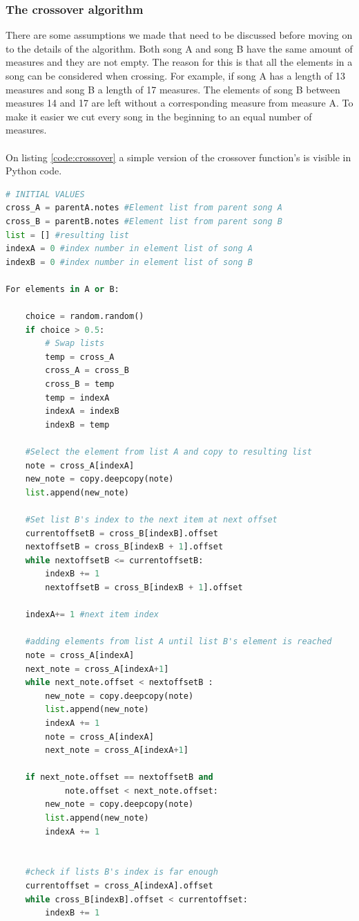 \documentclass[a4paper]{article}
\begin{document}
\subsubsection{The crossover algorithm}
There are some assumptions we made that need to be discussed before moving on to the details of the algorithm. Both song A and song B have the same amount of measures and they are not empty. The reason for this is that all the elements in a song can be considered when crossing. For example, if song A has a length of 13 measures and song B a length of 17 measures. The elements of song B between measures 14 and 17 are left without a corresponding measure from measure A. To make it easier we cut every song in the beginning to an equal number of measures.  
\\\\
On listing \ref{code:crossover} a simple version of the crossover function's is visible in Python code.
\begin{lstlisting}[language=Python,caption={Simplified version of the crossover function},captionpos=b,label=code:crossover]
# INITIAL VALUES
cross_A = parentA.notes #Element list from parent song A
cross_B = parentB.notes #Element list from parent song B
list = [] #resulting list
indexA = 0 #index number in element list of song A
indexB = 0 #index number in element list of song B

For elements in A or B:

	choice = random.random()
	if choice > 0.5:
		# Swap lists 
		temp = cross_A
		cross_A = cross_B
		cross_B = temp
		temp = indexA
		indexA = indexB
		indexB = temp
	
	#Select the element from list A and copy to resulting list
	note = cross_A[indexA]
	new_note = copy.deepcopy(note)
	list.append(new_note)
	
	#Set list B's index to the next item at next offset
	currentoffsetB = cross_B[indexB].offset
	nextoffsetB = cross_B[indexB + 1].offset
	while nextoffsetB <= currentoffsetB:
		indexB += 1
		nextoffsetB = cross_B[indexB + 1].offset
	
	indexA+= 1 #next item index
	
	#adding elements from list A until list B's element is reached
	note = cross_A[indexA]
	next_note = cross_A[indexA+1]
	while next_note.offset < nextoffsetB :
		new_note = copy.deepcopy(note)
		list.append(new_note)
		indexA += 1
		note = cross_A[indexA]
		next_note = cross_A[indexA+1]
		
	if next_note.offset == nextoffsetB and 
			note.offset < next_note.offset:
		new_note = copy.deepcopy(note)
		list.append(new_note)
		indexA += 1
	
	
	#check if lists B's index is far enough
	currentoffset = cross_A[indexA].offset
	while cross_B[indexB].offset < currentoffset:
		indexB += 1

	
\end{lstlisting}
\end{document}
